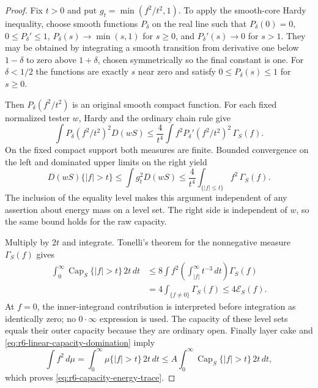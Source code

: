 \documentclass[11pt,a4paper]{article}
\numberwithin{equation}{section}
\theoremstyle{definition}
\theoremstyle{remark}
\begin{document}
\begin{proof}
Fix $t>0$ and put $g_t=\min(f^2/t^2,1)$. To apply the smooth-core
Hardy inequality, choose smooth functions $P_\delta$ on the real line
such that $P_\delta(0)=0$, $0\le P_\delta'\le1$,
$P_\delta(s)\to\min(s,1)$ for $s\ge0$, and
$P_\delta'(s)\to0$ for $s>1$. They may be obtained by integrating
a smooth transition from derivative one below $1-\delta$ to zero
above $1+\delta$, chosen symmetrically so the final constant is one.
For $\delta<1/2$ the functions are exactly $s$ near zero and satisfy
$0\le P_\delta(s)\le1$ for $s\ge0$.

Then $P_\delta(f^2/t^2)$ is an original smooth compact function.
For each fixed normalized tester $w$, Hardy and the ordinary chain
rule give
\[
 \int P_\delta(f^2/t^2)^2D(wS)
       \le\frac4{t^4}\int
              f^2P_\delta'(f^2/t^2)^2\,\Gamma_S(f).
\]
On the fixed compact support both measures are finite. Bounded
convergence on the left and dominated upper limits on the right yield
\[
 D(wS)\{|f|>t\}
    \le\int g_t^2D(wS)
    \le\frac4{t^4}\int_{\{|f|\le t\}}f^2\,\Gamma_S(f).
\]
The inclusion of the equality level makes this argument independent
of any assertion about energy mass on a level set. The right side is
independent of $w$, so the same bound holds for the raw capacity.

Multiply by $2t$ and integrate. Tonelli's theorem for the nonnegative
measure $\Gamma_S(f)$ gives
\[
 \begin{split}
 \int_0^\infty\operatorname{Cap}_S\{|f|>t\}\,2t\,dt
 &\le8\int f^2
          \left(\int_{|f|}^{\infty}t^{-3}\,dt\right)\Gamma_S(f)\\
 &=4\int_{\{f\ne0\}}\Gamma_S(f)
 \le4\mathcal E_S(f).
 \end{split}
\]
At $f=0$, the inner-integrand contribution is interpreted before
integration as identically zero; no $0\cdot\infty$ expression is used.
The capacity of these level sets equals their outer capacity because
they are ordinary open. Finally layer cake and
\eqref{eq:r6-linear-capacity-domination} imply
\[
 \int f^2\,d\mu
       =\int_0^\infty\mu\{|f|>t\}\,2t\,dt
       \le A\int_0^\infty\operatorname{Cap}_S\{|f|>t\}\,2t\,dt,
\]
which proves \eqref{eq:r6-capacity-energy-trace}.
\end{proof}
\end{document}

